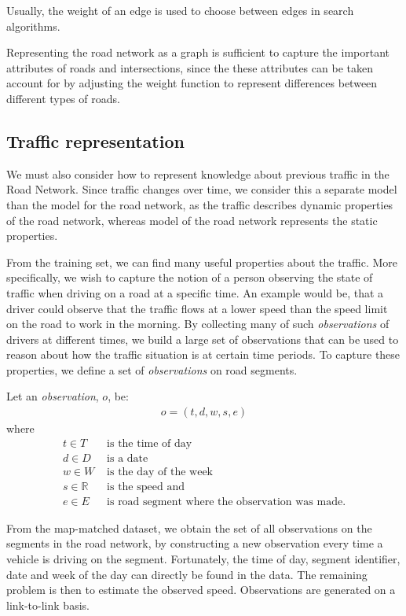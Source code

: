 Usually, the weight of an edge is used to choose between edges in search algorithms.

Representing the road network as a graph is sufficient to capture the important attributes of roads and intersections, since the these attributes can be taken account for by adjusting the weight function to represent differences between different types of roads.

\subsection{Traffic representation}\label{KR:traffic}
We must also consider how to represent knowledge about previous traffic in the Road Network. Since traffic changes over time, we consider this a separate model than the model for the road network, as the traffic describes dynamic properties of the road network, whereas model of the road network represents the static properties.

From the training set, we can find many useful properties about the traffic. More specifically, we wish to capture the notion of a person observing the state of traffic when driving on a road at a specific time. An example would be, that a driver could observe that the traffic flows at a lower speed than the speed limit on the road to work in the morning. By collecting many of such \emph{observations} of drivers at different times, we build a large set of observations that can be used to reason about how the traffic situation is at certain time periods. To capture these properties, we define a set of \emph{observations} on road segments.

Let an \emph{observation}, $o$, be:
\begin{align*}
o = (t, d, w, s, e)
\end{align*}
where
\begin{align*}
t \in T &\text{ is the time of day} \\
d \in D &\text{ is a date} \\
w \in W &\text{ is the day of the week} \\
s \in \mathbb{R} &\text{ is the speed and}\\
e \in E &\text{ is road segment where the observation was made.}
\end{align*}

From the map-matched dataset, we obtain the set of all observations on the segments in the road network, by constructing a new observation every time a vehicle is driving on the segment. Fortunately, the time of day, segment identifier, date and week of the day can directly be found in the data. The remaining problem is then to estimate the observed speed. Observations are generated on a link-to-link basis.

